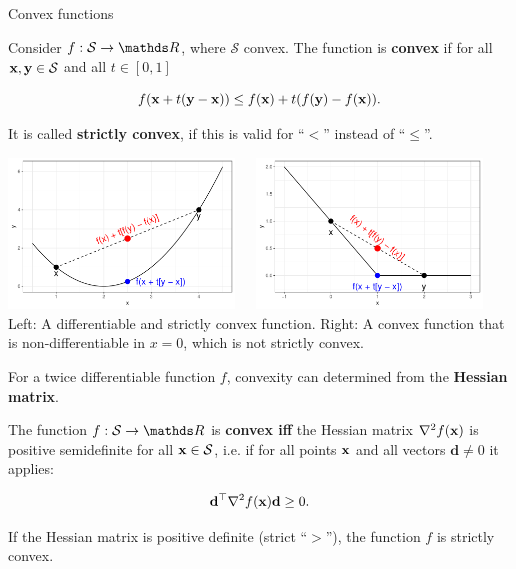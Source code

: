 \begin{vbframe}{Convex functions}

Consider $f: \mathcal{S} \to \R$, where $\mathcal{S}$ convex. The function is \textbf{convex} if for all $\mathbf{x}, \mathbf{y} \in \mathcal{S}$ and all $t \in [0, 1]$

$$
f(\mathbf{x} + t(\mathbf{y} - \mathbf{x})) \le f(\mathbf{x}) + t(f(\mathbf{y}) - f(\mathbf{x})).
$$

It is called \textbf{strictly convex}, if this is valid for \enquote{$<$} instead of \enquote{$\le$}.

\begin{center}
\includegraphics[width = 0.45\textwidth, keepaspectratio]{figure_man/convexity_1.pdf}~~~\includegraphics[width = 0.45\textwidth, keepaspectratio]{figure_man/convexity_2.pdf} \\
\footnotesize{Left: A differentiable and strictly convex function. Right: A convex function that is non-differentiable in $x = 0$, which is not strictly convex. }
\end{center}


\framebreak

For a twice differentiable function $f$, convexity can determined from the \textbf{Hessian matrix}.

\lz

The function $f: \mathcal{S} \to \R$ is \textbf{convex iff} the Hessian matrix $\nabla^2f(\mathbf{x})$ is positive semidefinite for all $\mathbf{x} \in \mathcal{S}$, i.e. if for all points $\mathbf{x}$ and all vectors $\mathbf{d} \ne 0$ it applies:

$$
\mathbf{d}^{\top} \nabla^2f(\mathbf{x})\mathbf{d} \ge 0.
$$

If the Hessian matrix is positive definite (strict \enquote{$>$}), the function $f$ is strictly convex.


\end{vbframe}
